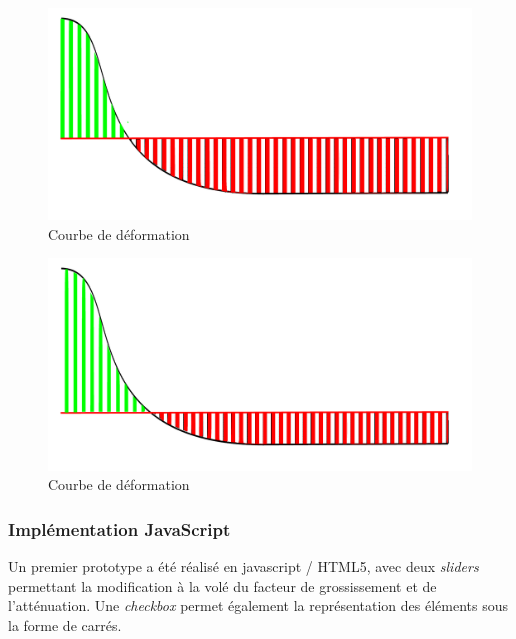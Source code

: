 \begin{minipage}[H]{.5\textwidth}
\begin{figure}[H]
  \centering
  \vspace{.4cm}
  \includegraphics[width=\textwidth]{../resources/illustrations/js_4}
  \caption{Courbe de déformation}
    \label{fig:js_4}
\end{figure}
\end{minipage}
\begin{minipage}[H]{.5\textwidth}
\begin{figure}[H]
  \centering
  \includegraphics[width=\textwidth]{../resources/illustrations/js_5}
  \vspace{.05cm}
  \caption{Courbe de déformation}
  \label{fig:js_5}
\end{figure}
\end{minipage}

\subsubsection{Implémentation JavaScript}

Un premier prototype a été réalisé en javascript / HTML5, avec deux \emph{sliders} permettant la modification à la volé du facteur de grossissement et de l'atténuation. Une \emph{checkbox} permet également la représentation des éléments sous la forme de carrés.

